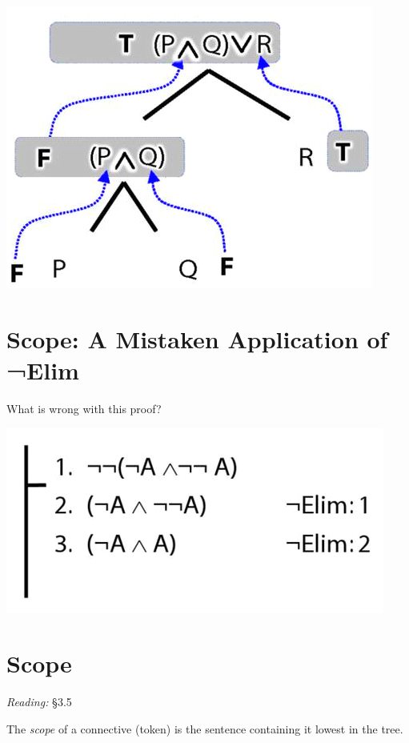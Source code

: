 \documentclass[12pt]{extarticle}
\begin{document}
\begin{multicols*}{3}
\begin{center}
\includegraphics[scale=0.3]{img/unit_230_tree_tt.png}
\end{center}
 
 
\section{Scope: A Mistaken Application of ¬Elim}
 
What is wrong with this proof?
 
\begin{center}
\includegraphics[scale=0.3]{img/proof_negation_elim_wrong.png}
\end{center}
 
 
\section{Scope}
 
\emph{Reading:} §3.5
 
The \emph{scope} of a connective (token) is the sentence containing it lowest in the tree.
 

\end{multicols*}
\end{document}
